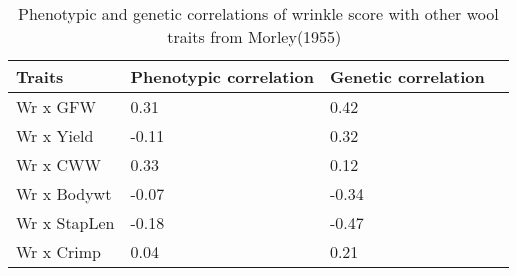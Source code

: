%

\begin{table}[h]
\centering
\caption{Phenotypic and genetic correlations of wrinkle score with other wool traits from Morley(1955)~\cite{morl:55}}
\label{tab:mor55}
\vspace{0.1in}
\begin{tabular}{|p{1.2in}|p{0.8in}|p{0.8in}|p{0.8in}|}  \hline
  Traits  & Phenotypic correlation  & Genetic correlation  \\  \hline
 Wr x GFW  & 0.31 & 0.42  \\
 Wr x Yield & -0.11 & 0.32 \\
 Wr x CWW & 0.33 & 0.12 \\
 Wr x Bodywt & -0.07 & -0.34 \\
 Wr x StapLen &  -0.18 & -0.47 \\
 Wr x Crimp & 0.04 & 0.21 \\ \hline
\end{tabular}
\end{table}

%

